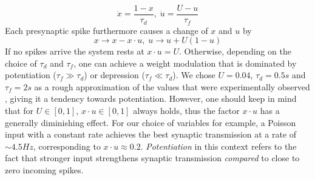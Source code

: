 \documentclass[10pt,a4paper]{article}
\begin{document}
\begin{equation}
\dot{x} = \frac{1-x}{\tau_d},\; \dot{u} = \frac{U-u}{\tau_f}
\label{STP_dynamics1}
\end{equation}
Each presynaptic spike furthermore causes a change of $x$ and $u$ by
\begin{equation}
x \rightarrow x - x\cdot u,\; u \rightarrow u + U(1-u)
\label{STP_dynamics2}
\end{equation}
If no spikes arrive the system rests at $x\cdot u = U$. Otherwise, depending on the choice of $\tau_d$ and $\tau_f$, one can achieve a weight modulation that is dominated by potentiation ($\tau_f \gg \tau_d$) or depression ($\tau_f \ll \tau_d$). We chose $U=0.04$, $\tau_d = 0.5s$ and $\tau_f = 2s$ as a rough approximation of the values that were experimentally observed \cite{Markram_STP}, giving it a tendency towards potentiation. However, one should keep in mind that for $U\in [0,1]$, $x\cdot u \in [0,1]$ always holds, thus the factor $x\cdot u$ has a generally diminishing effect. For our choice of variables for example, a Poisson input with a constant rate achieves the best synaptic transmission at a rate of $\sim 4.5 Hz$, corresponding to $x\cdot u \approx 0.2$. \textit{Potentiation} in this context refers to the fact that stronger input strengthens synaptic transmission \emph{compared} to close to zero incoming spikes.

\newpage
\end{document}
